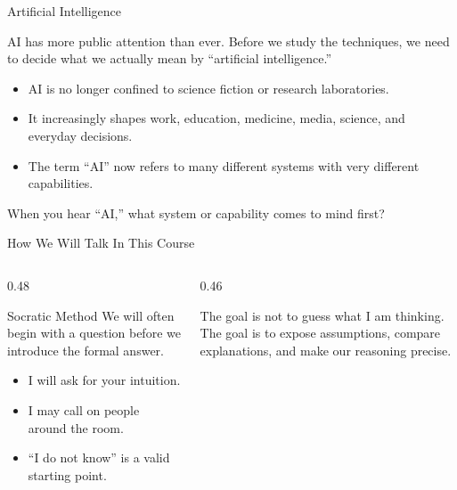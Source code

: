 \documentclass[aspectratio=169]{beamer}
\begin{document}
\makedecktitle


\begin{frame}{Artificial Intelligence}
  \begin{keyidea}
    AI has more public attention than ever. Before we study the techniques, we need to decide what we actually mean by ``artificial intelligence.''
  \end{keyidea}
  \vspace{0.06in}
  \begin{itemize}
    \item AI is no longer confined to science fiction or research laboratories.
    \item It increasingly shapes work, education, medicine, media, science, and everyday decisions.
    \item The term ``AI'' now refers to many different systems with very different capabilities.
  \end{itemize}
  \vspace{0.06in}
  \begin{activity}
    When you hear ``AI,'' what system or capability comes to mind first?
  \end{activity}
\end{frame}

\begin{frame}{How We Will Talk In This Course}
  \begin{columns}[T,onlytextwidth]
    \begin{column}{0.48\textwidth}
      \begin{block}{Socratic Method}
        We will often begin with a question before we introduce the formal answer.
      \end{block}
      \begin{itemize}
        \item I will ask for your intuition.
        \item I may call on people around the room.
        \item ``I do not know'' is a valid starting point.
      \end{itemize}
    \end{column}
    \begin{column}{0.46\textwidth}
      \begin{keyidea}
        The goal is not to guess what I am thinking. The goal is to expose assumptions, compare explanations, and make our reasoning precise.
      \end{keyidea}
    \end{column}
  \end{columns}
\end{frame}
\end{document}
